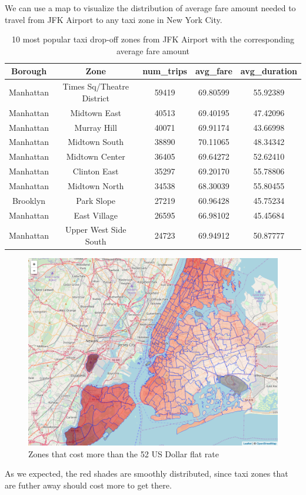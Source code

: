 \documentclass[12pt,twoside]{reedthesis}
\theoremstyle{definition}
\theoremstyle{definition}
\theoremstyle{definition}
\theoremstyle{remark}
\begin{document}
We can use a map to visualize the distribution of average fare amount
needed to travel from JFK Airport to any taxi zone in New York City.
\begin{table}

\caption{\label{tab:unnamed-chunk-101}10 most popular taxi drop-off zones from JFK Airport with the corresponding average fare amount}
\centering
\begin{tabular}[t]{ccccc}
\toprule
Borough & Zone & num\_trips & avg\_fare & avg\_duration\\
\midrule
Manhattan & Times Sq/Theatre District & 59419 & 69.80599 & 55.92389\\
Manhattan & Midtown East & 40513 & 69.40195 & 47.42096\\
Manhattan & Murray Hill & 40071 & 69.91174 & 43.66998\\
Manhattan & Midtown South & 38890 & 70.11065 & 48.34342\\
Manhattan & Midtown Center & 36405 & 69.64272 & 52.62410\\
\addlinespace
Manhattan & Clinton East & 35297 & 69.20170 & 55.78806\\
Manhattan & Midtown North & 34538 & 68.30039 & 55.80455\\
Brooklyn & Park Slope & 27219 & 60.96428 & 45.75234\\
Manhattan & East Village & 26595 & 66.98102 & 45.45684\\
Manhattan & Upper West Side South & 24723 & 69.94912 & 50.87777\\
\bottomrule
\end{tabular}
\end{table}
\begin{figure}

{\centering \includegraphics[width=4.96in]{figure/from_jkf_fare_vis} 

}

\caption{Zones that cost more than the 52 US Dollar flat rate}\label{fig:from-jkf-fare-vis}
\end{figure}
As we expected, the red shades are smoothly distributed, since taxi
zones that are futher away should cost more to get there.
\end{document}
